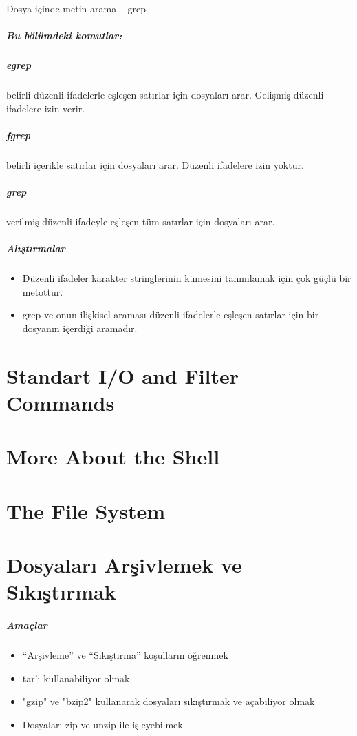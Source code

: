 \documentclass[10pt,a5paper]{book}
\begin{document}
\begin{section}{Dosya içinde metin arama – grep}
\paragraph{Bu bölümdeki komutlar:}{
\paragraph{egrep}{belirli düzenli ifadelerle eşleşen satırlar için dosyaları arar. Gelişmiş düzenli ifadelere izin verir.}
\paragraph{fgrep}{belirli içerikle satırlar için dosyaları arar. Düzenli ifadelere izin yoktur.}
\paragraph{grep}{verilmiş düzenli ifadeyle eşleşen tüm satırlar için dosyaları arar.}
}

\paragraph{Alıştırmalar}{
\begin{itemize}
 \item Düzenli ifadeler karakter stringlerinin kümesini tanımlamak için çok güçlü bir metottur.
 \item grep ve onun ilişkisel araması düzenli ifadelerle eşleşen satırlar için bir dosyanın içerdiği aramadır.
\end{itemize}}

\end{section}

\chapter{Standart I/O and Filter Commands}
\chapter{More About the Shell}
\chapter{The File System}
\chapter{Dosyaları Arşivlemek ve Sıkıştırmak}
\paragraph{Amaçlar}
\begin{itemize}
 \item “Arşivleme” ve “Sıkıştırma” koşulların öğrenmek
 \item tar'ı kullanabiliyor olmak
 \item "gzip" ve "bzip2" kullanarak dosyaları sıkıştırmak ve açabiliyor olmak
 \item Dosyaları zip ve unzip ile işleyebilmek
 \end{itemize}
\end{document}
